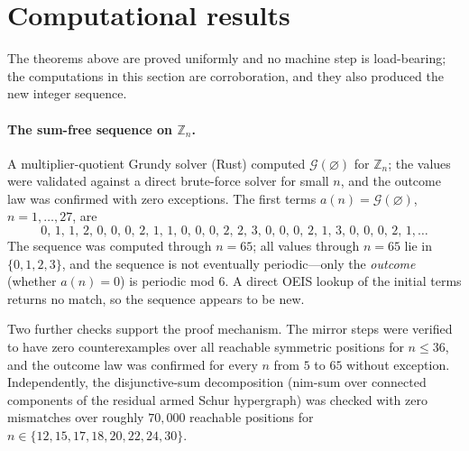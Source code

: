 \documentclass[11pt]{article}
\theoremstyle{plain}
\theoremstyle{definition}
\theoremstyle{remark}
\newcommand{\Zn}[1]{\mathbb{Z}_{#1}}
\newcommand{\Grundy}{\mathcal{G}}       %
\begin{document}








\section{Computational results}
\label{sec:computational}

The theorems above are proved uniformly and no machine step is load-bearing; the computations in
this section are corroboration, and they also produced the new integer sequence.

\paragraph{The sum-free sequence on $\Zn{n}$.} A multiplier-quotient Grundy solver (Rust) computed
$\Grundy(\varnothing)$ for $\Zn{n}$; the values were validated against a direct brute-force solver
for small $n$, and the outcome law was confirmed with zero exceptions.
The first terms $a(n)=\Grundy(\varnothing)$, $n=1,\dots,27$, are
\[
  0,\,1,\,1,\,2,\,0,\,0,\,0,\,2,\,1,\,1,\,0,\,0,\,0,\,2,\,2,\,3,\,0,\,0,\,0,\,2,\,1,\,3,\,0,\,0,\,0,\,2,\,1,\dots
\]
The sequence was computed through $n=65$; all values through $n=65$ lie in $\{0,1,2,3\}$, and the
sequence is not eventually periodic---only the \emph{outcome} (whether $a(n)=0$) is periodic mod
$6$. A direct OEIS lookup of the initial terms returns no match, so the sequence appears to be new.

Two further checks support the proof mechanism. The mirror steps were verified to have zero
counterexamples over all reachable symmetric positions for $n \leq 36$, and the outcome law was
confirmed for every $n$ from $5$ to $65$ without exception.
Independently, the disjunctive-sum decomposition (nim-sum over connected components of the residual
armed Schur hypergraph) was checked with zero mismatches over roughly $70{,}000$ reachable positions
for $n \in \{12,15,17,18,20,22,24,30\}$.
\end{document}
